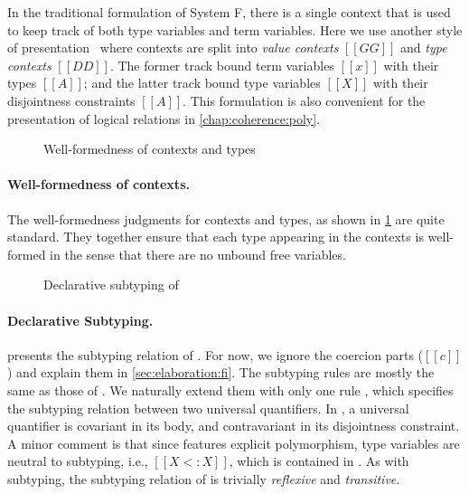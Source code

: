 In the traditional formulation of System F, there is a single context that is
used to keep track of both type variables and term variables. Here we use
another style of presentation~\citep[chap. 16]{Harper_2016} where contexts are
split into \textit{value contexts} $[[GG]]$ and \textit{type contexts} $[[DD]]$.
The former track bound term variables $[[x]]$ with their types $[[A]]$; and the
latter track bound type variables $[[X]]$ with their disjointness constraints
$[[A]]$. This formulation is also convenient for the presentation of logical
relations in \cref{chap:coherence:poly}.



\begin{figure}[t]
  \centering
  \caption{Well-formedness of contexts and types}
  \label{fig:well-formedness:fi}
\end{figure}

\paragraph{Well-formedness of contexts.}

The well-formedness judgments for contexts and types, as shown in
\cref{fig:well-formedness:fi} are quite standard. They together ensure that each
type appearing in the contexts is well-formed in the sense that there are no
unbound free variables.


\begin{figure}[t]
  \centering
  \caption{Declarative subtyping of \fnamee}
  \label{fig:subtyping:fi}
\end{figure}

\paragraph{Declarative Subtyping.}

 presents the subtyping relation of \fnamee. For now, we
ignore the coercion parts ($[[c]]$) and explain them in
\cref{sec:elaboration:fi}. The subtyping rules are mostly the same as those of
\namee. We naturally extend them with only one rule , which
specifies the subtyping relation between two universal quantifiers. In
, a universal quantifier is covariant in its body, and
contravariant in its disjointness constraint. A minor comment is that since
\fnamee features explicit polymorphism, type variables are neutral to subtyping,
i.e., $[[X <: X]]$, which is contained in . As with \namee
subtyping, the subtyping relation of \fnamee is trivially \textit{reflexive} and \textit{transitive}.


